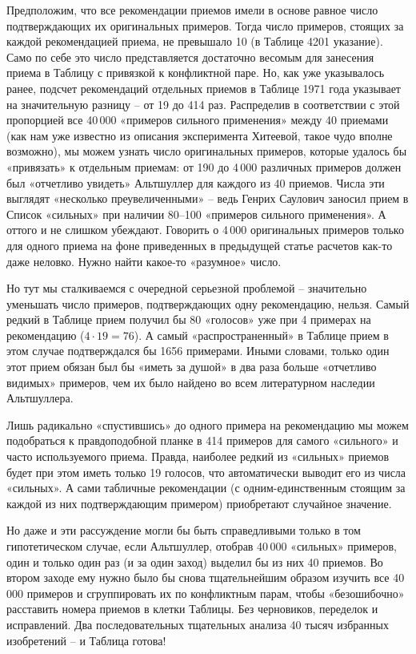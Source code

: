 \documentclass[11pt,a4paper]{article}
\begin{document}
Предположим, что все рекомендации приемов имели в основе равное число
подтверждающих их оригинальных примеров. Тогда число примеров, стоящих за
каждой рекомендацией приема, не превышало 10 (в Таблице 4201 указание). Само
по себе это число представляется достаточно весомым для занесения приема в
Таблицу с привязкой к конфликтной паре. Но, как уже указывалось ранее, подсчет
рекомендаций отдельных приемов в Таблице 1971 года указывает на значительную
разницу -- от 19 до 414 раз. Распределив в соответствии с этой пропорцией все
40\,000 «примеров сильного применения» между 40 приемами (как нам уже известно
из описания эксперимента Хитеевой, такое чудо вполне возможно), мы можем
узнать число оригинальных примеров, которые удалось бы «привязать» к отдельным
приемам: от 190 до 4\,000 различных примеров должен был «отчетливо увидеть»
Альтшуллер для каждого из 40 приемов. Числа эти выглядят «несколько
преувеличенными» -- ведь Генрих Саулович заносил прием в Список «сильных» при
наличии 80--100 «примеров сильного применения». А оттого и не слишком
убеждают. Говорить о 4\,000 оригинальных примеров только для одного приема на
фоне приведенных в предыдущей статье расчетов как-то даже неловко. Нужно найти
какое-то «разумное» число.

Но тут мы сталкиваемся с очередной серьезной проблемой -- значительно
уменьшать число примеров, подтверждающих одну рекомендацию, нельзя. Самый
редкий в Таблице прием получил бы 80 «голосов» уже при 4 примерах на
рекомендацию ($4\cdot 19 = 76$). А самый «распространенный» в Таблице прием в
этом случае подтверждался бы 1656 примерами. Иными словами, только один этот
прием обязан был бы «иметь за душой» в два раза больше «отчетливо видимых»
примеров, чем их было найдено во всем литературном наследии Альтшуллера.

Лишь радикально «спустившись» до одного примера на рекомендацию мы можем
подобраться к правдоподобной планке в 414 примеров для самого «сильного» и
часто используемого приема. Правда, наиболее редкий из «сильных» приемов будет
при этом иметь только 19 голосов, что автоматически выводит его из числа
«сильных». А сами табличные рекомендации (с одним-единственным стоящим за
каждой из них подтверждающим примером) приобретают случайное значение.

Но даже и эти рассуждение могли бы быть справедливыми только в том
гипотетическом случае, если Альтшуллер, отобрав 40\,000 «сильных» примеров,
один и только один раз (и за один заход) выделил бы из них 40 приемов. Во
втором заходе ему нужно было бы снова тщательнейшим образом изучить все
40\,000 примеров и сгруппировать их по конфликтным парам, чтобы «безошибочно»
расставить номера приемов в клетки Таблицы. Без черновиков, переделок и
исправлений. Два последовательных тщательных анализа 40 тысяч избранных
изобретений -- и Таблица готова!
\end{document}
